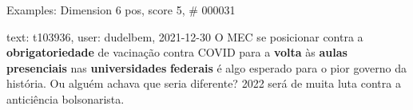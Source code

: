 \begin{frame}{Examples: Dimension 6 pos, score 5, \# 000031}
\footnotesize
\begin{exampleblock}{text: t103936, user: dudelbem, 2021-12-30}
O MEC se posicionar contra a \textbf{obrigatoriedade} de vacinação contra COVID 
para a \textbf{volta} às \textbf{aulas} \textbf{presenciais} nas 
\textbf{universidades} \textbf{federais} é algo esperado para o pior governo da 
história. Ou alguém achava que seria diferente? 2022 será de muita luta contra 
a anticiência bolsonarista. 
\end{exampleblock}
\end{frame}
